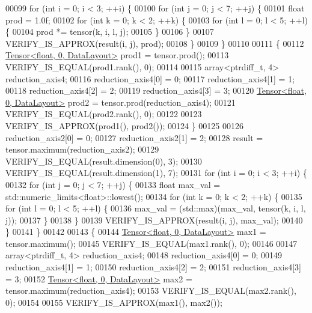 \begin{DoxyCode}
00099   \textcolor{keywordflow}{for} (\textcolor{keywordtype}{int} i = 0; i < 3; ++i) \{
00100     \textcolor{keywordflow}{for} (\textcolor{keywordtype}{int} j = 0; j < 7; ++j) \{
00101       \textcolor{keywordtype}{float} prod = 1.0f;
00102       \textcolor{keywordflow}{for} (\textcolor{keywordtype}{int} k = 0; k < 2; ++k) \{
00103         \textcolor{keywordflow}{for} (\textcolor{keywordtype}{int} l = 0; l < 5; ++l) \{
00104           prod *= tensor(k, i, l, j);
00105         \}
00106       \}
00107       VERIFY\_IS\_APPROX(result(i, j), prod);
00108     \}
00109   \}
00110 
00111   \{
00112     \hyperlink{class_eigen_1_1_tensor}{Tensor<float, 0, DataLayout>} prod1 = tensor.prod();
00113     VERIFY\_IS\_EQUAL(prod1.rank(), 0);
00114 
00115     array<ptrdiff\_t, 4> reduction\_axis4;
00116     reduction\_axis4[0] = 0;
00117     reduction\_axis4[1] = 1;
00118     reduction\_axis4[2] = 2;
00119     reduction\_axis4[3] = 3;
00120     \hyperlink{class_eigen_1_1_tensor}{Tensor<float, 0, DataLayout>} prod2 = tensor.prod(reduction\_axis4);
00121     VERIFY\_IS\_EQUAL(prod2.rank(), 0);
00122 
00123     VERIFY\_IS\_APPROX(prod1(), prod2());
00124   \}
00125 
00126   reduction\_axis2[0] = 0;
00127   reduction\_axis2[1] = 2;
00128   result = tensor.maximum(reduction\_axis2);
00129   VERIFY\_IS\_EQUAL(result.dimension(0), 3);
00130   VERIFY\_IS\_EQUAL(result.dimension(1), 7);
00131   \textcolor{keywordflow}{for} (\textcolor{keywordtype}{int} i = 0; i < 3; ++i) \{
00132     \textcolor{keywordflow}{for} (\textcolor{keywordtype}{int} j = 0; j < 7; ++j) \{
00133       \textcolor{keywordtype}{float} max\_val = std::numeric\_limits<float>::lowest();
00134       \textcolor{keywordflow}{for} (\textcolor{keywordtype}{int} k = 0; k < 2; ++k) \{
00135         \textcolor{keywordflow}{for} (\textcolor{keywordtype}{int} l = 0; l < 5; ++l) \{
00136           max\_val = (std::max)(max\_val, tensor(k, i, l, j));
00137         \}
00138       \}
00139       VERIFY\_IS\_APPROX(result(i, j), max\_val);
00140     \}
00141   \}
00142 
00143   \{
00144     \hyperlink{class_eigen_1_1_tensor}{Tensor<float, 0, DataLayout>} max1 = tensor.maximum();
00145     VERIFY\_IS\_EQUAL(max1.rank(), 0);
00146 
00147     array<ptrdiff\_t, 4> reduction\_axis4;
00148     reduction\_axis4[0] = 0;
00149     reduction\_axis4[1] = 1;
00150     reduction\_axis4[2] = 2;
00151     reduction\_axis4[3] = 3;
00152     \hyperlink{class_eigen_1_1_tensor}{Tensor<float, 0, DataLayout>} max2 = tensor.maximum(reduction\_axis4);
00153     VERIFY\_IS\_EQUAL(max2.rank(), 0);
00154 
00155     VERIFY\_IS\_APPROX(max1(), max2());

\end{DoxyCode}
